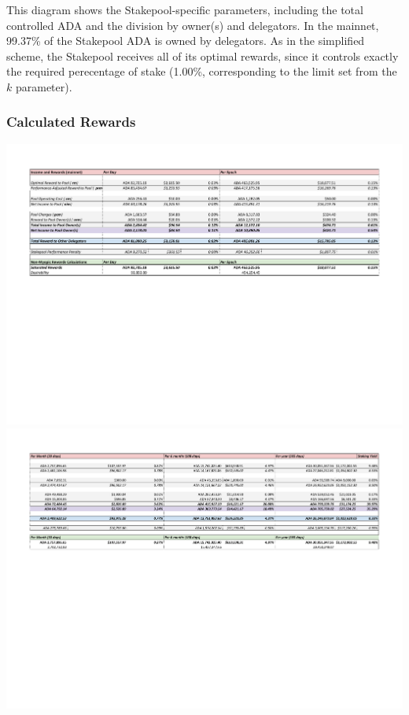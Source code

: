 \documentclass[11pt,a4paper,dvipsnames,twosided,final]{article}
\newcommand{\ada}{ADA{}}
\begin{document}
\noindent
This diagram shows the Stakepool-specific parameters, including the total controlled \ada{} and the
division by owner(s) and delegators.  In the mainnet, 99.37\% of the Stakepool \ada{} is owned
by delegators.  As in the simplified scheme, the Stakepool receives all of its optimal rewards, since it controls
exactly the required perecentage of stake (1.00\%, corresponding to the limit set from
the $k$ parameter).

\subsubsection*{Calculated Rewards}

\hspace{-0.65in}\begin{minipage}{\textwidth}
\noindent  \includegraphics[width=1.2\textwidth]{RCM4.pdf}
\noindent  \includegraphics[width=1.2\textwidth]{RCM5.pdf}
\end{minipage}
\end{document}
